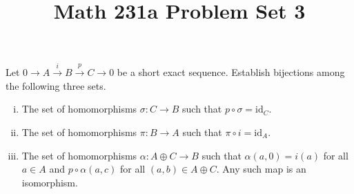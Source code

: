 \documentclass[11pt,letterpaper]{article}
\title{\textbf{Math 231a Problem Set 3}}
\begin{document}
\maketitle

\begin{problem}
    Let $0 \to A \xrightarrow{i} B \xrightarrow{p} C \to 0$ be a short exact sequence. Establish bijections among the following three sets.
    \begin{enumerate}[(i)]
        \item The set of homomorphisms $\sigma : C \to B$ such that $p\circ\sigma = \text{id}_{C}$.
        \item The set of homomorphisms $\pi : B \to A$ such that $\pi\circ i = \text{id}_A$.
        \item The set of homomorphisms $\alpha : A \oplus C \to B$ such that $\alpha(a,0)=i(a)$ for all $a\in A$ and $p\circ\alpha(a,c)$ for all $(a,b)\in A\oplus C$. Any such map is an isomorphism.
    \end{enumerate} 
\end{problem}
\end{document}
